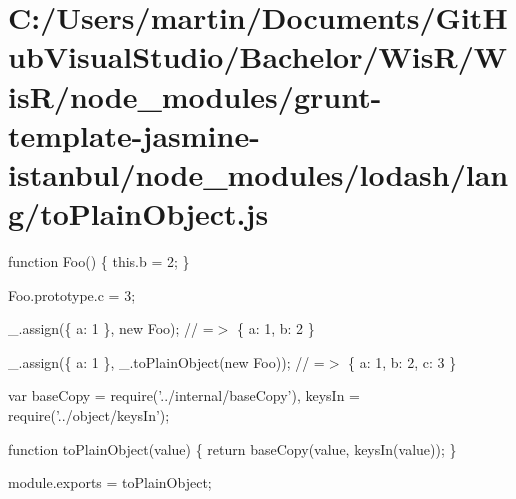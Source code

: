 \hypertarget{_c_1_2_users_2martin_2_documents_2_git_hub_visual_studio_2_bachelor_2_wis_r_2_wis_r_2node_moduleaf4f7a29251a06eca9f28199f54cd220}{}\section{C\+:/\+Users/martin/\+Documents/\+Git\+Hub\+Visual\+Studio/\+Bachelor/\+Wis\+R/\+Wis\+R/node\+\_\+modules/grunt-\/template-\/jasmine-\/istanbul/node\+\_\+modules/lodash/lang/to\+Plain\+Object.\+js}
function Foo() \{ this.\+b = 2; \}

Foo.\+prototype.\+c = 3;

\+\_\+.\+assign(\{ \textquotesingle{}a\textquotesingle{}\+: 1 \}, new Foo); // =$>$ \{ \textquotesingle{}a\textquotesingle{}\+: 1, \textquotesingle{}b\textquotesingle{}\+: 2 \}

\+\_\+.\+assign(\{ \textquotesingle{}a\textquotesingle{}\+: 1 \}, \+\_\+.\+to\+Plain\+Object(new Foo)); // =$>$ \{ \textquotesingle{}a\textquotesingle{}\+: 1, \textquotesingle{}b\textquotesingle{}\+: 2, \textquotesingle{}c\textquotesingle{}\+: 3 \}


\begin{DoxyCodeInclude}
var baseCopy = require(\textcolor{stringliteral}{'../internal/baseCopy'}),
    keysIn = require(\textcolor{stringliteral}{'../object/keysIn'});

\textcolor{keyword}{function} toPlainObject(value) \{
  \textcolor{keywordflow}{return} baseCopy(value, keysIn(value));
\}

module.exports = toPlainObject;
\end{DoxyCodeInclude}
 